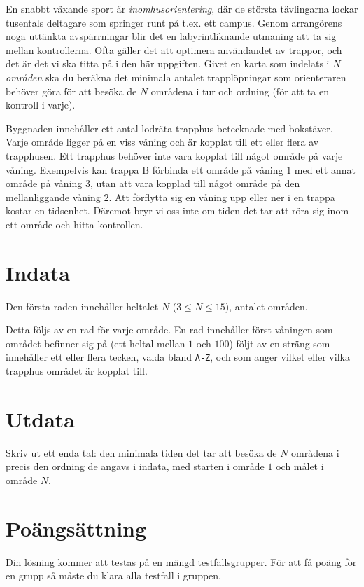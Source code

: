 En snabbt växande sport är \emph{inomhusorientering}, där de största tävlingarna lockar tusentals deltagare som springer runt på t.ex. ett campus.
Genom arrangörens noga uttänkta avspärrningar blir det en labyrintliknande utmaning att ta sig mellan kontrollerna.
Ofta gäller det att optimera användandet av trappor, och det är det vi ska titta på i den här uppgiften.
Givet en karta som indelats i $N$ \emph{områden} ska du beräkna det minimala antalet trapplöpningar som orienteraren behöver göra för att besöka de $N$ områdena i tur och ordning (för att ta en kontroll i varje).


Byggnaden innehåller ett antal lodräta trapphus betecknade med bokstäver.
Varje område ligger på en viss våning och är kopplat till ett eller flera av trapphusen.
Ett trapphus behöver inte vara kopplat till något område på varje våning.
Exempelvis kan trappa B förbinda ett område på våning $1$ med ett annat område på våning $3$, utan att vara kopplad till något område på den mellanliggande våning $2$.
Att förflytta sig en våning upp eller ner i en trappa kostar en tidsenhet.
Däremot bryr vi oss inte om tiden det tar att röra sig inom ett område och hitta kontrollen.

\section*{Indata}
Den första raden innehåller heltalet $N$ ($3\le N \le 15$), antalet områden.

Detta följs av en rad för varje område.
En rad innehåller först våningen som området befinner sig på (ett heltal mellan $1$ och $100$) följt av en sträng som innehåller ett eller flera tecken, valda bland \texttt{A-Z}, och som anger vilket eller vilka trapphus området är kopplat till.

\section*{Utdata}
Skriv ut ett enda tal: den minimala tiden det tar att besöka de $N$ områdena i precis den ordning de angavs i indata, med starten i område $1$ och målet i område $N$. 

\section*{Poängsättning}
Din lösning kommer att testas på en mängd testfallsgrupper.
För att få poäng för en grupp så måste du klara alla testfall i gruppen.


